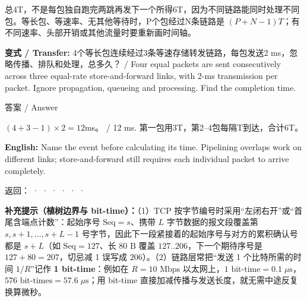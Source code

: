 总4T，不是每包独自跑完两跳再发下一个所得6T，因为不同链路能同时处理不同包。等长包、等速率、无其他等待时，P个包经过N条链路是 \((P+N-1)T\)；有不同速率、头部开销或其他流量时要重新画时间轴。


\textbf{变式 / Transfer:} 4个等长包连续经过3条等速存储转发链路，每包发送2 ms，忽略传播、排队和处理，总多久？ / Four equal packets are sent consecutively across three equal-rate store-and-forward links, with 2-ms transmission per packet. Ignore propagation, queueing and processing. Find the completion time.



\begin{StudySolution}{答案 / Answer}


\((4+3-1)\times2=12\)ms。 / 12 ms. 第一包用3T，第2–4包每隔T到达，合计6T。


\end{StudySolution}


\textbf{English:} Name the event before calculating its time. Pipelining overlaps work on different links; store-and-forward still requires each individual packet to arrive completely.


返回： ·  ·  ·  ·  ·  · 


\textbf{补充提示（植树边界与 bit-time）：}（1）TCP 按字节编号时采用“左闭右开”或“首尾含端点计数”：起始序号 \(\mathrm{Seq} = s\)、携带 \(L\) 字节数据的报文段覆盖第 \(s, s+1, \dots, s+L-1\) 号字节，因此下一段紧接着的起始序号与对方的累积确认号都是 \(s + L\)（如 \(\mathrm{Seq}=127\)、长 \(80\text{ B}\) 覆盖 \(127..206\)，下一个期待序号是 \(127 + 80 = 207\)，切忌减 1 误写成 \(206\)）。（2）链路层常把“发送 1 个比特所需的时间 \(1/R\)”记作 \textbf{1 bit-time}：例如在 \(R = 10\text{ Mbps}\) 以太网上，\(1\text{ bit-time} = 0.1\;\mu\text{s}\)，\(576\text{ bit-times} = 57.6\;\mu\text{s}\)；用 bit-time 直接加减传播与发送长度，就无需中途反复换算微秒。








